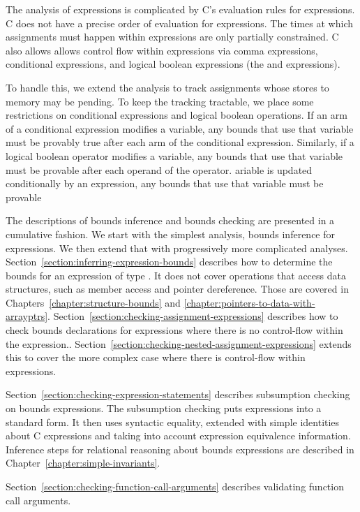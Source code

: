 The analysis of expressions is complicated by C's evaluation
rules for expressions.  C does not have a precise order of evaluation
for expressions.  The times at which assignments
must happen within expressions are only partially constrained.
C also allows allows control flow within 
expressions  via comma expressions,   conditional expressions, and
logical boolean expressions (the \code{&&} and \code{||} expressions).

To handle this, we extend the analysis to track assignments
whose stores to memory may be pending.  To keep the tracking
tractable, we place some restrictions on conditional expressions
and logical boolean operations.  If an arm of a conditional expression
modifies a variable, any bounds that use that variable must be provably
true after each arm of the conditional expression.  Similarly, if a
logical boolean operator modifies a variable, any bounds that
use that variable must be provable after each operand of the operator.
ariable is updated conditionally
by an expression, any bounds that use that variable must be provable

The descriptions of bounds inference and bounds checking are
presented in a cumulative fashion.  We start with the simplest
analysis, bounds inference for expressions.  We then extend that
with progressively more complicated analyses.
Section~\ref{section:inferring-expression-bounds}
describes how to determine the bounds for an expression of type \arrayptr.
It does not cover operations that access data structures, such as member
access and pointer dereference. 
Those are covered in Chapters~\ref{chapter:structure-bounds} and 
\ref{chapter:pointers-to-data-with-arrayptrs}.
Section~\ref{section:checking-assignment-expressions} describes
how to check bounds declarations for expressions where there is
no control-flow within the expression..
Section~\ref{section:checking-nested-assignment-expressions}
extends this to cover the more complex case where there is control-flow
within expressions.

Section~\ref{section:checking-expression-statements} describes
subsumption checking on bounds expressions.   The subsumption checking
puts expressions into a standard form.  It then uses syntactic equality,
extended with simple identities about C expressions and taking into account expression
equivalence information.
Inference steps for relational reasoning about bounds expressions 
are described in Chapter~\ref{chapter:simple-invariants}.

Section~\ref{section:checking-function-call-arguments}
describes validating function call arguments.

